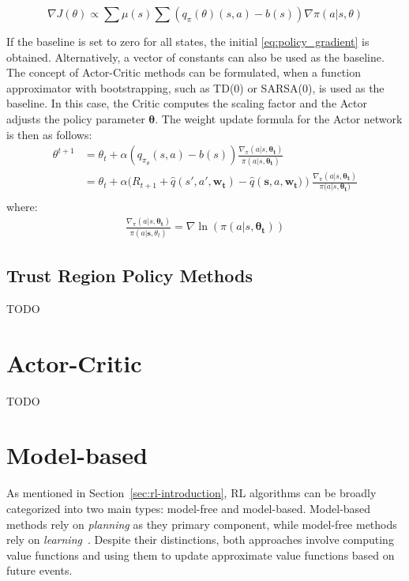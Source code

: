 \documentclass[../xlapes02]{subfiles}
\begin{document}
    \begin{equation}
        \nabla J(\theta) \propto \sum \mu(s) \sum (q_\pi(\theta) (s, a) - b(s)) \nabla \pi(a | s, \theta)
    \end{equation}

    If the baseline is set to zero for all states, the initial \cref{eq:policy_gradient} is obtained. Alternatively, a vector of constants can also be used as the baseline. The concept of Actor-Critic methods can be formulated, when a function approximator with bootstrapping, such as TD(0) or SARSA(0), is used as the baseline. In this case, the Critic computes the scaling factor and the Actor adjusts the policy parameter $\mathbf{\theta}$. The weight update formula for the Actor network is then as follows:
    \begin{equation}
        \begin{split}
            \theta^{ t + 1 } &= \theta_{ t } + \alpha( q_{ \pi_{ \theta } } ( s , a ) - b( s ) ) \frac{ \nabla_{ \pi } ( a | s, \mathbf{ \theta_{ t } } ) } { \pi( a | s, \mathbf{ \theta_{ t } } ) } \\
            &= \theta_{ t } + \alpha( R_{ t + 1 } + \hat{ q } ( s' , a', \mathbf{ w_{ t } } ) - \hat{ q } ( \mathbf{ s }, a, \mathbf{ w_{ t } ) } ) \frac{\nabla_{ \pi } ( a | s , \mathbf{\theta_{ t } } ) } { \pi( a | s, \mathbf{ \theta_{ t } ) } } \\
        \end{split}
    \end{equation}
    where:
    \begin{equation}
        \begin{split}
            \frac { \nabla_{ \pi } ( a | s, \mathbf{ \theta_{ t } } ) } { \pi ( a | \mathbf{ s }, \theta_{ t } ) } = \nabla \ln( \pi( a | s, \mathbf{ \theta_{ t } } ) )
        \end{split}
    \end{equation}

    \subsection{Trust Region Policy Methods}\label{subsec:trust-region-policy-methods}
    TODO


    \section{Actor-Critic}\label{sec:actor-critic}
    TODO


    \section{Model-based}\label{sec:model-based}
    As mentioned in Section~\cref{sec:rl-introduction}, RL algorithms can be broadly categorized into two main types: model-free and model-based. Model-based methods rely on \emph{planning} as they primary component, while model-free methods rely on \emph{learning}~\cite{sutton2018reinforcement}. Despite their distinctions, both approaches involve computing value functions and using them to update approximate value functions based on future events.
\end{document}
